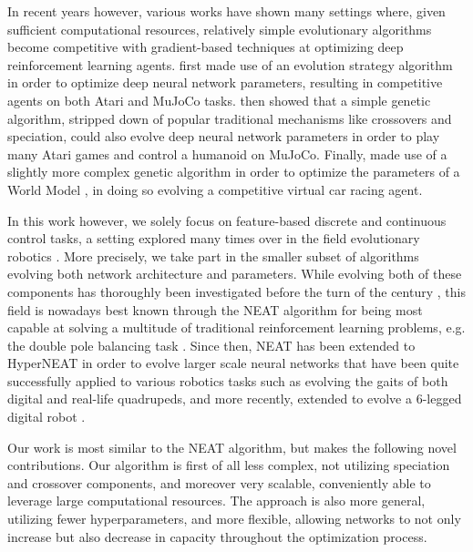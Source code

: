 \documentclass{article} %
\begin{document}
In recent years however, various works have shown many settings where, given sufficient computational resources, relatively simple evolutionary algorithms become competitive with gradient-based techniques at optimizing deep reinforcement learning agents. \cite{salimans2017evolution} first made use of an evolution strategy algorithm in order to optimize deep neural network parameters, resulting in competitive agents on both Atari and MuJoCo tasks. \cite{such2017deep} then showed that a simple genetic algorithm, stripped down of popular traditional mechanisms like crossovers and speciation, could also evolve deep neural network parameters in order to play many Atari games and control a humanoid on MuJoCo. Finally, \cite{risi2019deep} made use of a slightly more complex genetic algorithm in order to optimize the parameters of a World Model \citep{ha2018world}, in doing so evolving a competitive virtual car racing agent. 

In this work however, we solely focus on feature-based discrete and continuous control tasks, a setting explored many times over in the field evolutionary robotics \citep{doncieux2015evolutionary}. More precisely, we take part in the smaller subset of algorithms evolving both network architecture and parameters. While evolving both of these components has thoroughly been investigated before the turn of the century \citep{yao1999evolving}, this field is nowadays best known through the NEAT algorithm \citep{stanley2002evolving} for being most capable at solving a multitude of traditional reinforcement learning problems, e.g. the double pole balancing task \citep{stanley2004efficient}. Since then, NEAT has been extended to HyperNEAT \citep{stanley2009hypercube} in order to evolve larger scale neural networks that have been quite successfully applied to various robotics tasks such as evolving the gaits of both digital \citep{clune2009evolving} and real-life \citep{yosinski2011evolving} quadrupeds, and more recently, extended to evolve a 6-legged digital robot \citep{huizinga2016does}.

Our work is most similar to the NEAT algorithm, but makes the following novel contributions. Our algorithm is first of all less complex, not utilizing speciation and crossover components, and moreover very scalable, conveniently able to leverage large computational resources. The approach is also more general, utilizing fewer hyperparameters, and more flexible, allowing networks to not only increase but also decrease in capacity throughout the optimization process.
\end{document}
